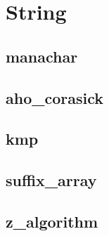 \section{String}

\subsection{manachar}


\subsection{aho_corasick}


\subsection{kmp}


\subsection{suffix_array}


\subsection{z_algorithm}



